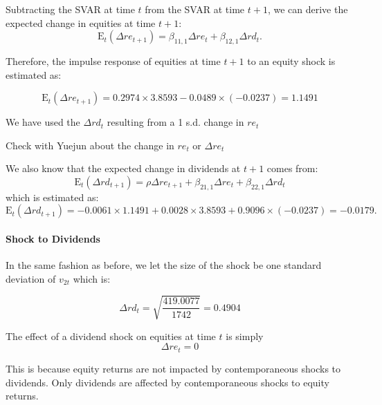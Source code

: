 \documentclass[11pt]{article}
\begin{document}
Subtracting the SVAR at time $t$ from the SVAR at time $t+1$, we can derive the expected change in equities at time $t+1$:
\begin{equation}
\mathrm{E}_t\left(\Delta r e_{t+1}\right)=\beta_{11,1} \Delta r e_t+\beta_{12,1} \Delta r d_t.
\end{equation}

Therefore, the impulse response of equities at time $t+1$ to an equity shock is estimated as:

\begin{equation}
\mathrm{E}_t\left(\Delta r e_{t+1}\right)=0.2974 \times 3.8593-0.0489 \times(-0.0237)=1.1491
\end{equation}
\begin{note}
    We have used the $\Delta rd_t$ resulting from a 1 s.d. change in $re_t$
\end{note}
\begin{mdframed}
    Check with Yuejun about the change in $re_t$ or $\Delta re_t$
\end{mdframed}

We also know that the expected change in dividends at $t+1$ comes from:
\begin{equation}
\mathrm{E}_t\left(\Delta r d_{t+1}\right)=\rho \Delta r e_{t+1}+\beta_{21,1} \Delta r e_t+\beta_{22,1} \Delta r d_t
\end{equation}
which is estimated as:
\begin{equation}
\mathrm{E}_t\left(\Delta r d_{t+1}\right)=-0.0061 \times 1.1491+0.0028 \times 3.8593+0.9096 \times(-0.0237)=-0.0179 .
\end{equation}

\paragraph{Shock to Dividends} \mbox{}

In the same fashion as before, we let the size of the shock be one standard deviation of $v_{2t}$ which is:

\begin{equation}
\Delta r d_t=\sqrt{\frac{419.0077}{1742}}=0.4904
\end{equation}

The effect of a dividend shock on equities at time $t$ is simply
\[\Delta re_t = 0\]

This is because equity returns are not impacted by contemporaneous shocks to dividends. Only dividends are affected by contemporaneous shocks to equity returns.
\end{document}
